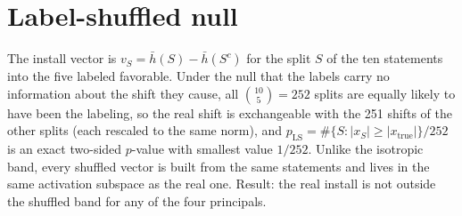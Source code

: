 \documentclass{article}
\begin{document}
\section{Label-shuffled null}
\label{app:ls}
The install vector is $v_S=\bar h(S)-\bar h(S^c)$ for the split $S$ of the ten statements into the five labeled favorable. Under the null that the labels
carry no information about the shift they cause, all $\binom{10}{5}=252$ splits are equally likely to have been the labeling, so the real shift is
exchangeable with the 251 shifts of the other splits (each rescaled to the same norm), and $p_{\mathrm{LS}}=\#\{S:|x_S|\ge|x_{\text{true}}|\}/252$ is an
exact two-sided $p$-value with smallest value $1/252$. Unlike the isotropic band, every shuffled vector is built from the same statements and lives in the
same activation subspace as the real one. Result: the real install is not outside the shuffled band for any of the four principals.
\end{document}
